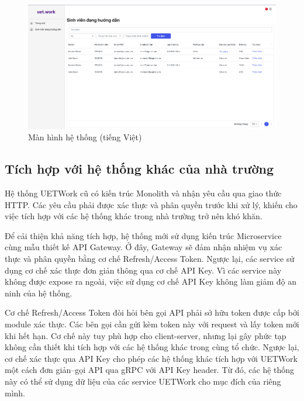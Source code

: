 \documentclass[./../main.tex]{subfiles}
\begin{document}
\begin{figure}[]
	\includegraphics[width=\linewidth]{./images/image12.png}
	\caption{Màn hình hệ thống (tiếng Việt)}
	\label{fig:vi_page}
\end{figure}

\subsection{Tích hợp với hệ thống khác của nhà trường}

Hệ thống UETWork cũ có kiến trúc Monolith và nhận yêu cầu qua giao thức HTTP. Các yêu cầu phải được xác thực và phân quyền trước khi xử lý, khiến cho việc tích hợp với các hệ thống khác trong nhà trường trở nên khó khăn.

Để cải thiện khả năng tích hợp, hệ thống mới sử dụng kiến trúc Microservice cùng mẫu thiết kế API Gateway. Ở đây, Gateway sẽ đảm nhận nhiệm vụ xác thực và phân quyền bằng cơ chế Refresh/Access Token. Ngược lại, các service sử dụng cơ chế xác thực đơn giản thông qua cơ chế API Key. Vì các service này không được expose ra ngoài, việc sử dụng cơ chế API Key không làm giảm độ an ninh của hệ thống.

Cơ chế Refresh/Access Token đòi hỏi bên gọi API phải sở hữu token được cấp bởi module xác thực. Các bên gọi cần gửi kèm token này với request và lấy token mới khi hết hạn. Cơ chế này tuy phù hợp cho client-server, nhưng lại gây phức tạp không cần thiết khi tích hợp với các hệ thống khác trong cùng tổ chức. Ngược lại, cơ chế xác thực qua API Key cho phép các hệ thống khác tích hợp với UETWork một cách đơn giản--gọi API qua gRPC với API Key header. Từ đó, các hệ thống này có thể sử dụng dữ liệu của các service UETWork cho mục đích của riêng mình.
\end{document}
